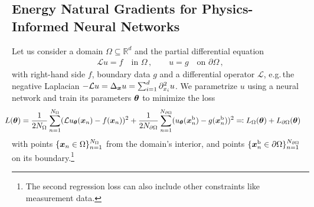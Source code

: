 \subsection{Energy Natural Gradients for Physics-Informed Neural Networks}
Let us consider a domain $\Omega\subseteq\mathbb R^d$ and the partial differential equation
\begin{align*}
  \mathcal{L} u = f \quad \text{in }\Omega\,,
                   \qquad
  u = g \quad \text{on }\partial\Omega\,,
\end{align*}
with right-hand side $f$, boundary data $g$ and a differential operator
$\mathcal{L}$, e.g.\,the negative Laplacian $-\mathcal{L} u = \Delta_{{\bm{x}}} u = \sum_{i=1}^d \partial_{{x}_i}^2 u$.
We parametrize $u$ using a neural network and train its parameters ${\bm{\theta}}$ to minimize the loss
\begin{align}\label{eq:pinn-loss}
  \!\!\!\!\!\!
  L({\bm{\theta}})
  &=
    \frac{1}{2N_\Omega} \sum_{n=1}^{N_\Omega} (\mathcal{L} u_{\bm{\theta}}({\bm{x}}_n) - f({\bm{x}}_n))^2
    +
    \frac{1}{2N_{\partial\Omega}}\sum_{n=1}^{N_{\partial\Omega}} ( u_{\bm{\theta}}({\bm{x}}^\text{b}_n) - g({\bm{x}}^\text{b}_n))^2
    \eqqcolon
    L_\Omega({\bm{\theta}}) + L_{\partial\Omega}({\bm{\theta}})
\end{align}
with points $\{{\bm{x}}_n \in \Omega \}_{n=1}^{N_\Omega}$ from the domain's interior, and points $\{{\bm{x}}^\text{b}_n \in \partial\Omega \}_{n=1}^{N_{\partial\Omega}}$ on its boundary.\footnote{The second regression loss can also include other constraints like measurement data.}

